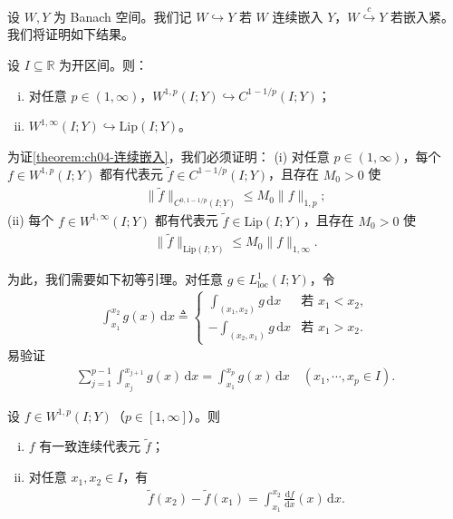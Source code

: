 \documentclass[../../main.tex]{subfiles}%
\begin{document}
设 $W,Y$ 为 Banach 空间。我们记 $W\hookrightarrow Y$ 若 $W$ 连续嵌入 $Y$，$W\overset{c}{\hookrightarrow}Y$ 若嵌入紧。我们将证明如下结果。

\begin{theorem}\label{theorem:ch04-连续嵌入}
设 $I\subseteq\mathbb{R}$ 为开区间。则：
\begin{enumerate}[(i)]
\item\label{item:ch04-连续嵌入-i} 对任意 $p\in(1,\infty)$，$W^{1,p}(I;Y)\hookrightarrow C^{1-1/p}(I;Y)$；
\item\label{item:ch04-连续嵌入-ii} $W^{1,\infty}(I;Y)\hookrightarrow\mathrm{Lip}(I;Y)$。
\end{enumerate}
\end{theorem}

为证\cref{theorem:ch04-连续嵌入}，我们必须证明：
(i) 对任意 $p\in(1,\infty)$，每个 $f\in W^{1,p}(I;Y)$ 都有代表元 $\tilde f\in C^{1-1/p}(I;Y)$，且存在 $M_0>0$ 使
\begin{align}
\|\tilde f\|_{C^{0,1-1/p}(I;Y)}\leqslant M_0\|f\|_{1,p}; \label{align:ch04-4.130a}
\end{align}
(ii) 每个 $f\in W^{1,\infty}(I;Y)$ 都有代表元 $\tilde f\in\mathrm{Lip}(I;Y)$，且存在 $M_0>0$ 使
\begin{align}
\|\tilde f\|_{\mathrm{Lip}(I;Y)}\leqslant M_0\|f\|_{1,\infty}. \label{align:ch04-4.130b}
\end{align}

为此，我们需要如下初等引理。对任意 $g\in L^1_{\mathrm{loc}}(I;Y)$，令
\begin{align*}
\int_{x_1}^{x_2}g(x)\,\mathrm{d}x\triangleq 
\begin{cases}
\int_{(x_1,x_2)}g\,\mathrm{d}x & \text{若 }x_1<x_2,\\
-\int_{(x_2,x_1)}g\,\mathrm{d}x & \text{若 }x_1>x_2.
\end{cases}
\end{align*}
易验证
\begin{align}
\sum_{j=1}^{p-1}\int_{x_j}^{x_{j+1}}g(x)\,\mathrm{d}x=\int_{x_1}^{x_p}g(x)\,\mathrm{d}x\quad(x_1,\cdots ,x_p\in I). \label{align:ch04-4.131}
\end{align}

\begin{lemma}\label{lemma:ch04-绝对连续代表}
设 $f\in W^{1,p}(I;Y)$（$p\in[1,\infty]$）。则
\begin{enumerate}[(i)]
\item\label{item:ch04-绝对连续代表-i} $f$ 有一致连续代表元 $\tilde f$；
\item\label{item:ch04-绝对连续代表-ii} 对任意 $x_1,x_2\in I$，有
\begin{align}
\tilde f(x_2)-\tilde f(x_1)=\int_{x_1}^{x_2}\frac{\mathrm{d}f}{\mathrm{d}x}(x)\,\mathrm{d}x. \label{align:ch04-4.132}
\end{align}
\end{enumerate}
\end{lemma}
\end{document}
